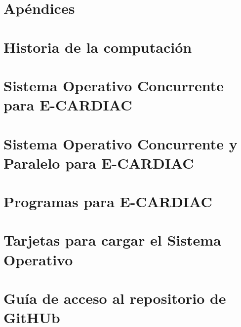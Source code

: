 \documentclass[letterpaper,12pt,oneside]{book}
\begin{document}


\newpage

\newpage
\appendix  %

\chapter*{Apéndices} %
\thispagestyle{empty}
\newpage

\chapter{Historia de la computación}


\chapter{Sistema Operativo Concurrente para E-CARDIAC}


\chapter{Sistema Operativo Concurrente y Paralelo para E-CARDIAC}


\chapter{Programas para E-CARDIAC}


\chapter{Tarjetas para cargar el Sistema Operativo}


\chapter{Guía de acceso al repositorio de GitHUb}

\end{document}
